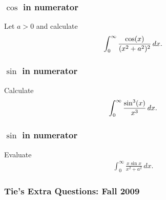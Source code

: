 \hypertarget{cos-in-numerator}{%
\subsubsection{\texorpdfstring{\(\cos\) in
numerator}{\textbackslash cos in numerator}}\label{cos-in-numerator}}

\begin{problem}[?]

Let \(a>0\) and calculate
\begin{align*}
\int_0^\infty {\cos(x) \over (x^2 + a^2)^2}\, dx
.\end{align*}

\end{problem}

\hypertarget{sin-in-numerator-2}{%
\subsubsection{\texorpdfstring{\(\sin\) in
numerator}{\textbackslash sin in numerator}}\label{sin-in-numerator-2}}

\begin{problem}[?]

Calculate
\begin{align*}
\int_0^\infty {\sin^3(x) \over x^3} \, dx
.\end{align*}

\end{problem}

\hypertarget{sin-in-numerator-3}{%
\subsubsection{\texorpdfstring{\(\sin\) in
numerator}{\textbackslash sin in numerator}}\label{sin-in-numerator-3}}

\begin{problem}[?]

Evaluate
\begin{align*}
\displaystyle{ \int_{0}^{\infty}\frac{x\sin x}{x^2+a^2} \, dx }
.\end{align*}

\end{problem}

\hypertarget{ties-extra-questions-fall-2009}{%
\subsubsection{Tie's Extra Questions: Fall
2009}\label{ties-extra-questions-fall-2009}}

